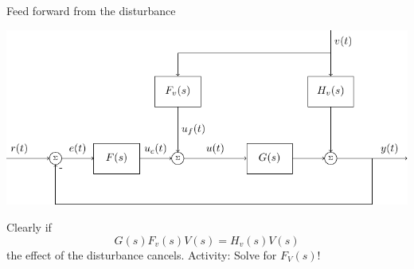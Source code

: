 \documentclass[presentation,aspectratio=169, usenames, dvipsnames]{beamer}
\begin{document}
\begin{frame}[label={sec:orgdc7375e}]{Feed forward from the disturbance}
\begin{center}
\includegraphics[width=0.7\linewidth]{../../figures/block-diagram-ffw}
\end{center}

Clearly if 
\[ G(s)F_v(s)V(s) = H_v(s)V(s)\]
the effect of the disturbance cancels. 
\alert{Activity: Solve for \(F_V(s)\)!}
\end{frame}
\end{document}
